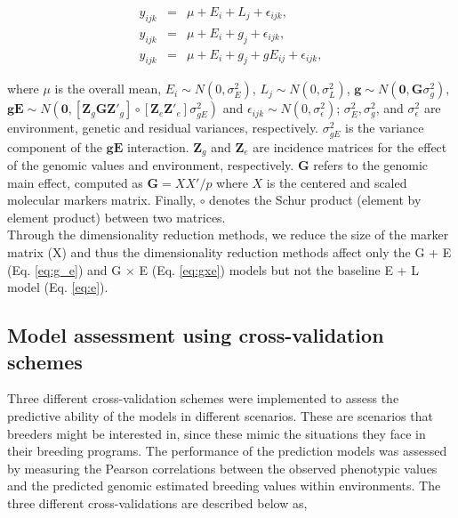 \begin{eqnarray}
y_{ijk} &=& \mu + E_i + L_j+ \epsilon_{ijk}, \label{eq:e} \\
y_{ijk} &=& \mu + E_i + g_j + \epsilon_{ijk},\label{eq:g_e}\\
y_{ijk} &=& \mu + E_i + g_j + gE_{ij} + \epsilon_{ijk} \label{eq:gxe},
\end{eqnarray}

\noindent where $\mu$ is the overall mean, $E_i \sim N(0, \sigma_E^2)$, $L_j \sim N(0, \sigma_L^2)$, $\textbf{g} \sim N(\textbf{0}, \textbf{G}\sigma_g^2)$, $\textbf{gE} \sim N\left(\textbf{0}, [\textbf{Z}_g\textbf{G}\textbf{Z}'_{g}]\circ [\textbf{Z}_e\textbf{Z}'_e]\sigma_{gE}^2 \right)$ and $\epsilon_{ijk} \sim N(0,  \sigma_\epsilon^2)$; $\sigma^2_E, \sigma^2_g$, and $\sigma^2_\epsilon$ are environment, genetic and residual variances, respectively. $\sigma^2_{gE}$ is the variance component of the $\textbf{gE}$ interaction. $\textbf{Z}_g$ and $\textbf{Z}_e$ are incidence matrices for the effect of the genomic values and environment, respectively. $\textbf{G}$ refers to the genomic main effect, computed as $\textbf{G} = XX'/p$ where $X$ is the centered and scaled molecular markers matrix. Finally, $\circ$ denotes the Schur product (element by element product) between two matrices.\\

Through the dimensionality reduction methods, we reduce the size of the marker matrix (X) and thus the dimensionality reduction methods affect only the G + E (Eq. \ref{eq:g_e}) and G $\times$ E (Eq. \ref{eq:gxe}) models but not the baseline E + L model (Eq. \ref{eq:e}). \\

\subsection{Model assessment using cross-validation schemes}

Three different cross-validation schemes \cite{roorkiwal_genomic-enabled_2018} were implemented to assess the predictive ability of the models in different scenarios. These are scenarios that breeders might be interested in, since these mimic the situations they face in their breeding programs. The performance of the prediction models was assessed by measuring the Pearson correlations between the observed phenotypic values and the predicted genomic estimated breeding values within environments. The three different cross-validations are described below as, 

